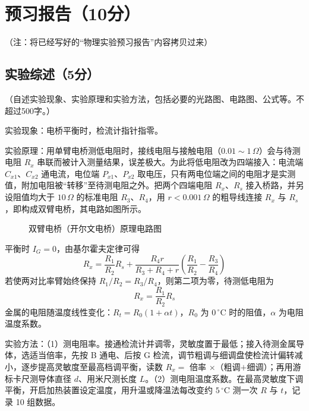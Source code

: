 \documentclass{Phyport}
\begin{document}
\setcounter{page}{1}
\makecover

\section{预习报告（10分）}
（注：将已经写好的“物理实验预习报告”内容拷贝过来）

\subsection{实验综述（5分）}
（自述实验现象、实验原理和实验方法，包括必要的光路图、电路图、公式等。不超过500字。）

实验现象：电桥平衡时，检流计指针指零。

实验原理：用单臂电桥测低电阻时，接线电阻与接触电阻（$0.01\sim1\,\Omega$）会与待测电阻 $R_x$ 串联而被计入测量结果，误差极大。为此将低电阻改为四端接入：电流端 $C_{x1}$、$C_{x2}$ 通电流，电位端 $P_{x1}$、$P_{x2}$ 取电压，只有两电位端之间的电阻才是实测值，附加电阻被“转移”至待测电阻之外。把两个四端电阻 $R_x$、$R_s$ 接入桥路，并另设阻值均大于 $10\,\Omega$ 的标准电阻 $R_3$、$R_4$，用 $r<0.001\,\Omega$ 的粗导线连接 $R_x$ 与 $R_s$，即构成双臂电桥，其电路如图所示。

\begin{figure}[H]
    \centering
    \ArmBridge
    \caption{双臂电桥（开尔文电桥）原理电路图}
    \label{fig:armbridge}
\end{figure}

平衡时 $I_G=0$，由基尔霍夫定律可得
\begin{equation}
    R_x=\frac{R_1}{R_2}R_s+\frac{R_4 r}{R_3+R_4+r}\left(\frac{R_1}{R_2}-\frac{R_3}{R_4}\right)
    \label{eq:rx}
\end{equation}
若使两对比率臂始终保持 $R_1/R_2=R_3/R_4$，则第二项为零，待测低电阻为
\begin{equation}
    R_x=\frac{R_1}{R_2}R_s
    \label{eq:rx2}
\end{equation}
金属的电阻随温度线性变化：$R_t=R_0(1+\alpha t)$，$R_0$ 为 $0\,^\circ\mathrm{C}$ 时的阻值，$\alpha$ 为电阻温度系数。

实验方法：（1）测电阻率。接通检流计并调零，灵敏度置于最低；接入待测金属导体，选适当倍率，先按 B 通电、后按 G 检流，调节粗调与细调盘使检流计偏转减小，逐步提高灵敏度至最高档调平衡，读数 $R_x=$ 倍率 $\times$（粗调$+$细调）；再用游标卡尺测导体直径 $d$、用米尺测长度 $L$。（2）测电阻温度系数。在最高灵敏度下调平衡，开启加热装置设定温度，用升温或降温法每改变约 $5\,^\circ\mathrm{C}$ 测一次 $R$ 与 $t$，记录 10 组数据。
\end{document}
